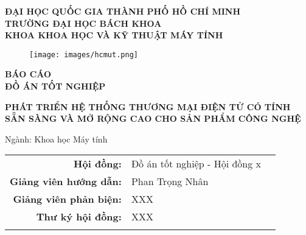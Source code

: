 \begin{titlepage}

    \begingroup
        \fontsize{15pt}{12pt}\selectfont
        \begin{center}
            \textbf{
                ĐẠI HỌC QUỐC GIA THÀNH PHỐ HỒ CHÍ MINH \\
                TRƯỜNG ĐẠI HỌC BÁCH KHOA \\
                KHOA KHOA HỌC VÀ KỸ THUẬT MÁY TÍNH
            }
        \end{center}       
    \endgroup
    
    \vspace{1cm}
    
    \begin{figure}[h!]
        \begin{center}
            \texttt{[image: images/hcmut.png]}
        \end{center}
    \end{figure}
    
    \vspace{0.5cm}

    \begingroup
        \fontsize{15pt}{12pt}\selectfont
        \begin{center}
            \textbf{BÁO CÁO} \\
            \textbf{ĐỒ ÁN TỐT NGHIỆP}
        \end{center}       
    \endgroup

    \vspace{0.5cm}


    \begingroup
        \fontsize{18pt}{12pt}\selectfont
        \begin{center}
            \textbf{PHÁT TRIỂN HỆ THỐNG THƯƠNG MẠI ĐIỆN TỬ CÓ TÍNH SẴN SÀNG VÀ MỞ RỘNG CAO CHO SẢN PHẨM CÔNG NGHỆ}
        \end{center}       
    \endgroup

    \vspace{0.5cm}

    \begingroup
        \fontsize{15pt}{12pt}\selectfont
        \begin{center}
            Ngành: Khoa học Máy tính
        \end{center}       
    \endgroup
    
    \vspace{1.5cm}

    \begingroup
        \fontsize{14pt}{12pt}\selectfont
        \begin{center}
            \begin{tabular}{rll}
                \color{black} \textbf{Hội đồng:} & \color{black} Đồ án tốt nghiệp - Hội đồng x &  \\
                \color{black} \textbf{Giảng viên hướng dẫn:} & \color{black} Phan Trọng Nhân &  \\
                \color{black} \textbf{Giảng viên phản biện:} & \color{black} XXX &  \\
                \color{black} \textbf{Thư ký hội đồng:} & \color{black} XXX &  \\
                \\


\end{tabular}
\end{center}
\end{titlepage}
